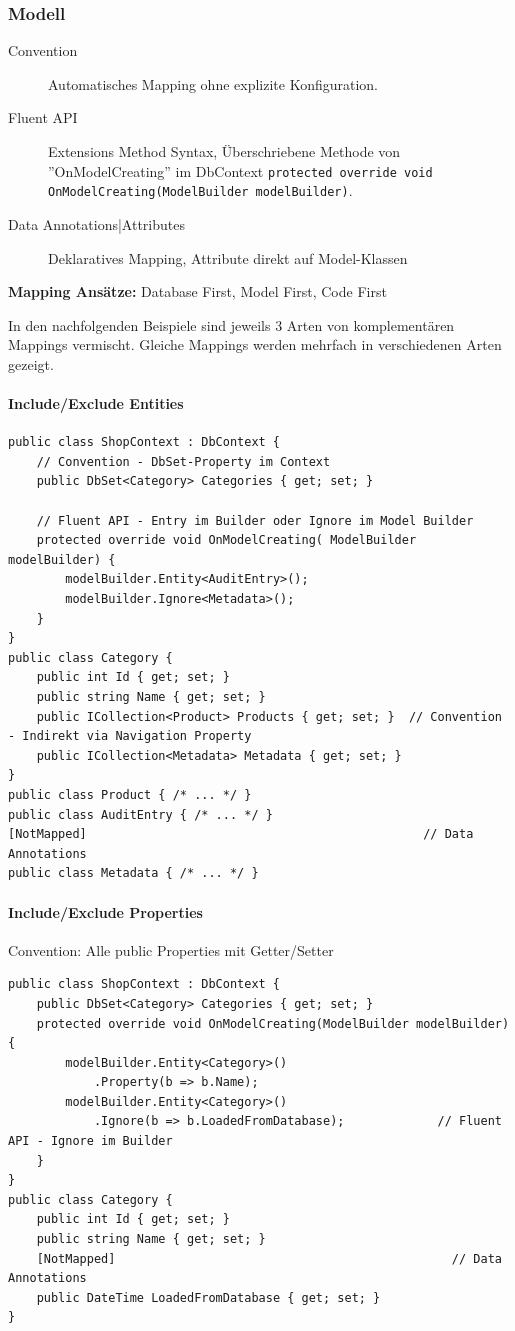 \documentclass[
a4paper,
oneside,
10pt,
fleqn,
headsepline,
toc=listofnumbered, 
bibliography=totocnumbered]{scrartcl}
\begin{document}
\subsubsection{Modell}
\begin{description}
    \item[Convention] Automatisches Mapping ohne explizite Konfiguration.
    \item[Fluent API] Extensions Method Syntax, Überschriebene Methode von ''OnModelCreating'' im DbContext \lstinline|protected override void OnModelCreating(ModelBuilder modelBuilder)|.
    \item[Data Annotations|Attributes] Deklaratives Mapping, Attribute direkt auf Model-Klassen
\end{description}

\textbf{Mapping Ansätze:} Database First, Model First, Code First

In den nachfolgenden Beispiele sind jeweils 3 Arten von komplementären Mappings vermischt. Gleiche Mappings werden mehrfach in verschiedenen Arten gezeigt.

\paragraph{Include/Exclude Entities}
\begin{lstlisting}
public class ShopContext : DbContext {
    // Convention - DbSet-Property im Context
    public DbSet<Category> Categories { get; set; }
    
    // Fluent API - Entry im Builder oder Ignore im Model Builder
    protected override void OnModelCreating( ModelBuilder modelBuilder) {
        modelBuilder.Entity<AuditEntry>();          
        modelBuilder.Ignore<Metadata>();
    }
}
public class Category {
    public int Id { get; set; }
    public string Name { get; set; }
    public ICollection<Product> Products { get; set; }  // Convention - Indirekt via Navigation Property
    public ICollection<Metadata> Metadata { get; set; }
}
public class Product { /* ... */ }
public class AuditEntry { /* ... */ }
[NotMapped]                                               // Data Annotations
public class Metadata { /* ... */ }
\end{lstlisting}

\paragraph{Include/Exclude Properties} 
 Convention: Alle public Properties mit Getter/Setter
\begin{lstlisting}
public class ShopContext : DbContext {
    public DbSet<Category> Categories { get; set; }
    protected override void OnModelCreating(ModelBuilder modelBuilder) {
        modelBuilder.Entity<Category>()
            .Property(b => b.Name);                     
        modelBuilder.Entity<Category>()
            .Ignore(b => b.LoadedFromDatabase);             // Fluent API - Ignore im Builder
    }
}
public class Category {
    public int Id { get; set; }
    public string Name { get; set; }
    [NotMapped]                                               // Data Annotations
    public DateTime LoadedFromDatabase { get; set; }
}
\end{lstlisting}
\end{document}
